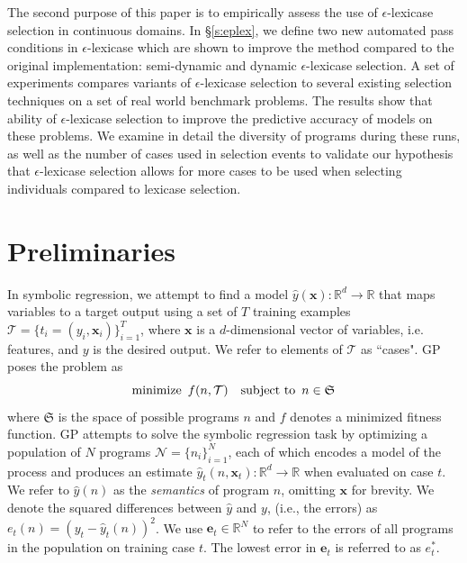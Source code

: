 \documentclass[twoside]{article}
\begin{document}
The second purpose of this paper is to empirically assess the use of $\epsilon$-lexicase selection in continuous domains. In \S\ref{s:eplex}, we define two new automated pass conditions in $\epsilon$-lexicase which are shown to improve the method compared to the original implementation: semi-dynamic and dynamic $\epsilon$-lexicase selection. A set of experiments compares variants of $\epsilon$-lexicase selection to several existing selection techniques on a set of real world benchmark problems. The results show that ability of $\epsilon$-lexicase selection to improve the predictive accuracy of models on these problems. We examine in detail the diversity of programs during these runs, as well as the number of cases used in selection events to validate our hypothesis that $\epsilon$-lexicase selection allows for more cases to be used when selecting individuals compared to lexicase selection.   


\section{Preliminaries}
In symbolic regression, we attempt to find a model $\hat{y}(\mathbf{x}): \mathbb{R}^d \rightarrow \mathbb{R}$ that maps variables to a target output using a set of $T$ training examples $\mathcal{T} = \{t_i = (y_i,\mathbf{x}_i)\}_{i=1}^T$, where $\mathbf{x}$ is a $d$-dimensional vector of variables, i.e. features, and $y$ is the desired output. We refer to elements of $\mathcal{T}$ as ``cases". GP poses the problem as
\begin{equation} \label{eq:gp}
\text{minimize} \hspace{0.5em} {f(n,\mathcal{T})} \hspace{1em} \text{subject to} \hspace{0.5em} {n \in \mathfrak{S}}
\end{equation}
where $\mathfrak{S}$ is the space of possible programs $n$ and $f$ denotes a minimized fitness function. GP attempts to solve the symbolic regression task by optimizing a population of $N$ programs $\mathcal{N} = \{n_i\}_{i=1}^N$, each of which encodes a model of the process and produces an estimate  $\hat{y}_t(n,\mathbf{x}_t): \mathbb{R}^d \rightarrow \mathbb{R}$ when evaluated on case $t$. We refer to $\hat{y}(n)$ as the {\it semantics} of program $n$, omitting $\mathbf{x}$ for brevity. We denote the squared differences between $\hat{y}$ and $y$, (i.e., the errors) as $e_t(n) = (y_t - \hat{y}_t(n))^2$.  We use $\mathbf{e}_t \in \mathbb{R}^N$ to refer to the errors of all programs in the population on training case $t$. The lowest error in $\mathbf{e}_t$ is referred to as $e^*_t$. 
\end{document}
